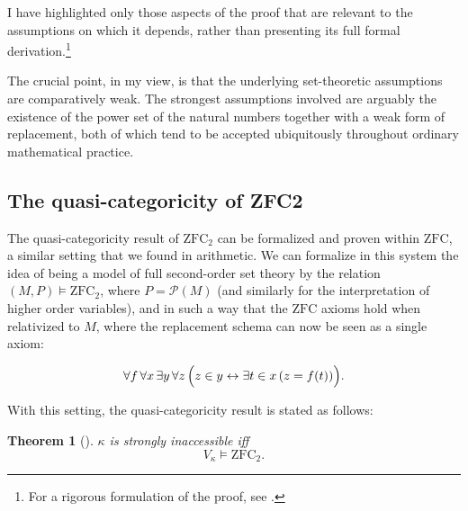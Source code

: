 \documentclass[11pt,a4paper]{book}
\theoremstyle{plain}
\newtheorem*{theorem*}{Theorem}
\begin{document}
I have highlighted only those aspects of the proof that are relevant to the assumptions on which it depends, rather than presenting its full formal derivation.\footnote{For a rigorous formulation of the proof, see \textcite[82]{shapiro1991foundations}.}

The crucial point, in my view, is that the underlying set-theoretic assumptions are comparatively weak. The strongest assumptions involved are arguably the existence of the power set of the natural numbers together with a weak form of replacement, both of which tend to be accepted ubiquitously throughout ordinary mathematical practice.

\subsection{The quasi-categoricity of ZFC2}

The quasi-categoricity result of $\mathrm{ZFC}_2$ can be formalized and proven within $\mathrm{ZFC}$, a similar setting that we found in arithmetic. We can formalize in this system the idea of being a model of full second-order set theory by the relation $(M,P) \models \mathrm{ZFC}_2$, where $P=\mathcal{P}(M)$ (and similarly for the interpretation of higher order variables), and in such a way that the $\mathrm{ZFC}$ axioms hold when relativized to $M$, where the replacement schema can now be seen as a single axiom:

\[
\forall f\,\forall x\,\exists y\,\forall z\,
\Bigl(
z\in y \leftrightarrow \exists t\in x\,(z=f(t))
\Bigr).
\]

With this setting, the quasi-categoricity result is stated as follows:

\begin{theorem*}[\textcite{Zermelo1930}]
  
\(\kappa\) is strongly inaccessible iff
\[
V_\kappa \models \mathrm{ZFC}_2 .
\]

\end{theorem*}
\end{document}
